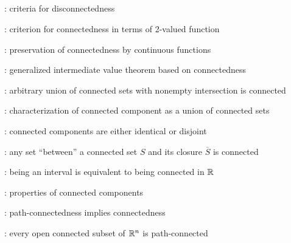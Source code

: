 \subsection*{}
\item {}: criteria for disconnectedness
\item {}: criterion for connectedness in terms of 2-valued function
\item {}: preservation of connectedness by continuous functions
\item {}: generalized intermediate value theorem based on connectedness
\item {}: arbitrary union of connected sets with nonempty intersection is connected
\item {}: characterization of connected component as a union of connected sets
\item {}: connected components are either identical or disjoint
\item {}: any set ``between'' a connected set \(S\) and its closure \(\overline{S}\) is connected
\item {}: being an interval is equivalent to being connected in \(\mathbb{R}\)
\item {}: properties of connected components
\item {}: path-connectedness implies connectedness
\item {}: every open connected subset of \(\mathbb{R}^n\) is path-connected
